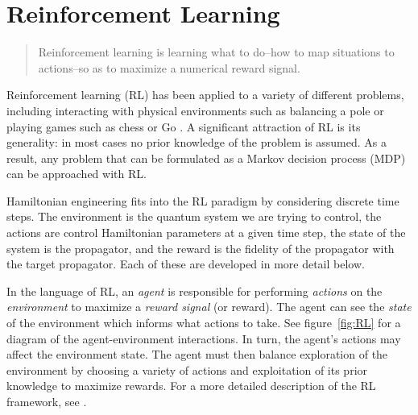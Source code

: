 
\chapter{Reinforcement Learning}



\begin{quote}
    Reinforcement learning is learning what to do--how to map situations to actions--so as to maximize a numerical reward signal. \cite{sutton2018reinforcement}
\end{quote}
Reinforcement learning  (RL) has been applied to a variety of different problems, including interacting with physical environments such as balancing a pole \cite{lillicrap2015continuous} or playing games such as chess or Go \cite{Silver1140}. A significant attraction of RL is its generality: in most cases no prior knowledge of the problem is assumed. As a result, any problem that can be formulated as a Markov decision process (MDP) can be approached with RL.

Hamiltonian engineering fits into the RL paradigm by considering discrete time steps. The environment is the quantum system we are trying to control, the actions are control Hamiltonian parameters at a given time step, the state of the system is the propagator, and the reward is the fidelity of the propagator with the target propagator.  Each of these are developed in more detail below.


In the language of RL, an \emph{agent} is responsible for performing \emph{actions} on the \emph{environment} to maximize a \emph{reward signal} (or reward). The agent can see the \emph{state} of the environment which informs what actions to take. See figure~\ref{fig:RL} for a diagram of the agent-environment interactions. In turn, the agent's actions may affect the environment state. The agent must then balance exploration of the environment by choosing a variety of actions and exploitation of its prior knowledge to maximize rewards.
For a more detailed description of the RL framework, see \cite{sutton2018reinforcement}.

